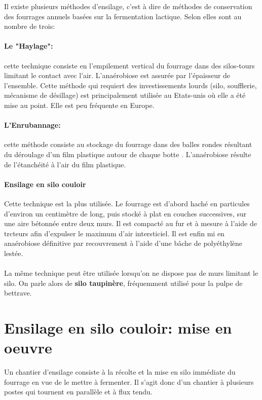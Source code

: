 \documentclass[12pt,a4paper]{report}
\begin{document}
Il existe plusieurs méthodes d'ensilage, c'est à dire de méthodes de conservation des fourrages annuels basées sur la fermentation lactique. Selon \cite{noauthor_ensilage_2018} elles sont au nombre de trois:

\paragraph{Le "Haylage":} cette technique  consiste en l'empilement vertical du fourrage dans des silos-tours limitant le contact avec l'air. L'anaérobiose est assurée par l'épaisseur de l'ensemble.
Cette méthode qui requiert des investissements lourds (silo, soufflerie, mécanisme de désillage) est principalement utilisée au Etats-unis où elle a été mise au point. Elle est peu fréquente en Europe.

\paragraph{L'Enrubannage:} cette méthode consiste au stockage du fourrage dans des balles rondes résultant du déroulage d'un film plastique autour de chaque botte . L'anaérobiose résulte de l'étanchéité à l'air du film plastique.


\paragraph{Ensilage en silo couloir} Cette technique est la plus utilisée. Le fourrage est d'abord haché en particules d'environ un centimètre de long, puis stocké à plat en couches successives, sur une aire bétonnée entre deux murs. Il est compacté au fur et à mesure à l'aide de trcteurs afin d'expulser le maximum d'air intersticiel. Il est enfin mi en anaérobiose définitive par recouvrement à l'aide d'une bâche de polyéthylène lestée.

\paragraph{} La même technique peut être utilisée lorsqu'on ne dispose pas de murs limitant le silo. On parle alors de \textbf{silo taupinère}, fréquemment utilisé pour la pulpe de bettrave.

\section{Ensilage en silo couloir: mise en oeuvre}

Un chantier d'ensilage consiste à la récolte et la mise en silo immédiate du fourrage en vue de le mettre à fermenter. Il s'agit donc d'un chantier à plusieurs postes qui tournent en parallèle et à flux tendu.
\end{document}
